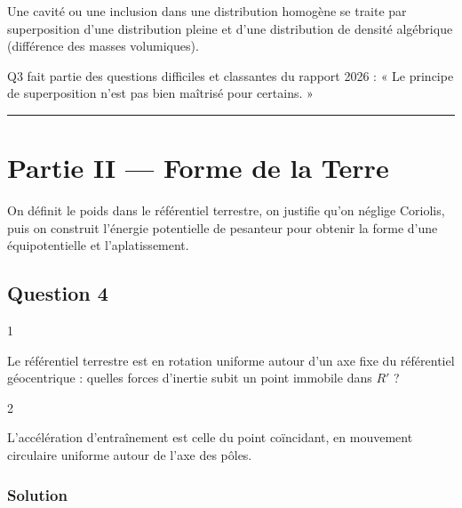 \documentclass[11pt,a4paper]{article}
\begin{document}
\begin{methode}

Une cavité ou une inclusion dans une distribution homogène se traite par superposition d'une distribution pleine et d'une distribution de densité algébrique (différence des masses volumiques).

\end{methode}

\begin{jury}

Q3 fait partie des questions difficiles et classantes du rapport 2026 : « Le principe de superposition n'est pas bien maîtrisé pour certains. »

\end{jury}

\begin{center}\rule{0.5\linewidth}{0.5pt}\end{center}

\hypertarget{partie-ii-forme-de-la-terre}{%
\section{Partie II --- Forme de la Terre}\label{partie-ii-forme-de-la-terre}}

On définit le poids dans le référentiel terrestre, on justifie qu'on néglige Coriolis, puis on construit l'énergie potentielle de pesanteur pour obtenir la forme d'une équipotentielle et l'aplatissement.

\hypertarget{question-4}{%
\subsection{Question 4}\label{question-4}}

\begin{indication}{1}

Le référentiel terrestre est en rotation uniforme autour d'un axe fixe du référentiel géocentrique : quelles forces d'inertie subit un point immobile dans \(R'\) ?

\end{indication}

\begin{indication}{2}

L'accélération d'entraînement est celle du point coïncidant, en mouvement circulaire uniforme autour de l'axe des pôles.

\end{indication}

\hypertarget{solution-3}{%
\subsubsection{Solution}\label{solution-3}}
\end{document}
